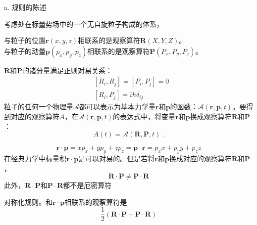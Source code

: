 \documentclass[11pt,a4paper]{article}
\renewcommand{\vec}[1]{\boldsymbol{#1}}
\begin{document}
a. 规则的陈述

考虑处在标量势场中的一个无自旋粒子构成的体系，
\begin{tcolorbox}[colback=green!15,colframe=green!40!black,title= ]
与粒子的位置$\vec{r}(x, y, z)$相联系的是观察算符$\vec{R}(X, Y, Z)$。\\
与粒子的动量$\vec{p}(p_x, p_y, p_z)$相联系的是观察算符$\vec{P}(P_x, P_y, P_z)$。
\end{tcolorbox}
$\vec{R}$和$\vec{P}$的诸分量满足正则对易关系：
\begin{align}
& [R_i, R_j] = [P_i, P_j] = 0 \\
& [R_i, P_j] = i\hbar \delta_{ij}
\end{align}
粒子的任何一个物理量$\mathscr{A}$都可以表示为基本力学量$\vec{r}$和$\vec{p}$的函数：$\mathscr{A}(\vec{r}, \vec{p}, t)$。要得到对应的观察算符$A$，在$\mathscr{A}(\vec{r}, \vec{p}, t)$的表达式中，将变量$\vec{r}$和$\vec{p}$换成观察算符$\vec{R}$和$\vec{P}$：
\begin{equation}
A(t) = \mathscr{A}(\vec{R}, \vec{P}, t) ~.
\end{equation}

\begin{equation}
\vec{r} \cdot \vec{p} = xp_x + yp_y +zp_z = \vec{p} \cdot \vec{r} = p_x x + p_y y +p_z z
\end{equation}
在经典力学中标量积$\vec{r} \cdot \vec{p}$是可以对易的。但是若将$\vec{r}$和$\vec{p}$换成对应的观察算符$\vec{R}$和$\vec{P}$，
\begin{equation}
\vec{R} \cdot \vec{P} \neq \vec{P} \cdot \vec{R} 
\end{equation}
此外，$\vec{R} \cdot \vec{P}$和$\vec{P} \cdot \vec{R} $都不是厄密算符

对称化规则。和$\vec{r} \cdot \vec{p}$相联系的观察算符是
\begin{equation}
\dfrac{1}{2} (\vec{R} \cdot \vec{P} +\vec{P} \cdot \vec{R})
\end{equation}
\end{document}
